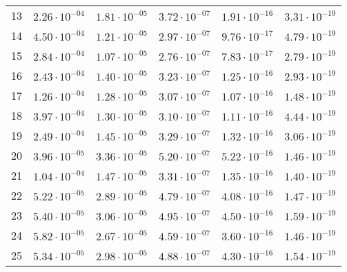 \begin{table}[h]
\begin{tabular}{llllll}
		13 &$\mathrm{2.26 \cdot 10^{-04}}$ & $\mathrm{1.81 \cdot 10^{-05}}$ & $\mathrm{3.72 \cdot 10^{-07}}$ & $\mathrm{1.91 \cdot 10^{-16}}$ & $\mathrm{3.31 \cdot 10^{-19}}$ \\
		14 &$\mathrm{4.50 \cdot 10^{-04}}$ & $\mathrm{1.21 \cdot 10^{-05}}$ & $\mathrm{2.97 \cdot 10^{-07}}$ & $\mathrm{9.76 \cdot 10^{-17}}$ & $\mathrm{4.79 \cdot 10^{-19}}$ \\
		15 &$\mathrm{2.84 \cdot 10^{-04}}$ & $\mathrm{1.07 \cdot 10^{-05}}$ & $\mathrm{2.76 \cdot 10^{-07}}$ & $\mathrm{7.83 \cdot 10^{-17}}$ & $\mathrm{2.79 \cdot 10^{-19}}$ \\
		16 &$\mathrm{2.43 \cdot 10^{-04}}$ & $\mathrm{1.40 \cdot 10^{-05}}$ & $\mathrm{3.23 \cdot 10^{-07}}$ & $\mathrm{1.25 \cdot 10^{-16}}$ & $\mathrm{2.93 \cdot 10^{-19}}$ \\
		17 &$\mathrm{1.26 \cdot 10^{-04}}$ & $\mathrm{1.28 \cdot 10^{-05}}$ & $\mathrm{3.07 \cdot 10^{-07}}$ & $\mathrm{1.07 \cdot 10^{-16}}$ & $\mathrm{1.48 \cdot 10^{-19}}$ \\
		18 &$\mathrm{3.97 \cdot 10^{-04}}$ & $\mathrm{1.30 \cdot 10^{-05}}$ & $\mathrm{3.10 \cdot 10^{-07}}$ & $\mathrm{1.11 \cdot 10^{-16}}$ & $\mathrm{4.44 \cdot 10^{-19}}$ \\
		19 &$\mathrm{2.49 \cdot 10^{-04}}$ & $\mathrm{1.45 \cdot 10^{-05}}$ & $\mathrm{3.29 \cdot 10^{-07}}$ & $\mathrm{1.32 \cdot 10^{-16}}$ & $\mathrm{3.06 \cdot 10^{-19}}$ \\
		20 &$\mathrm{3.96 \cdot 10^{-05}}$ & $\mathrm{3.36 \cdot 10^{-05}}$ & $\mathrm{5.20 \cdot 10^{-07}}$ & $\mathrm{5.22 \cdot 10^{-16}}$ & $\mathrm{1.46 \cdot 10^{-19}}$ \\
		21 &$\mathrm{1.04 \cdot 10^{-04}}$ & $\mathrm{1.47 \cdot 10^{-05}}$ & $\mathrm{3.31 \cdot 10^{-07}}$ & $\mathrm{1.35 \cdot 10^{-16}}$ & $\mathrm{1.40 \cdot 10^{-19}}$ \\
		22 &$\mathrm{5.22 \cdot 10^{-05}}$ & $\mathrm{2.89 \cdot 10^{-05}}$ & $\mathrm{4.79 \cdot 10^{-07}}$ & $\mathrm{4.08 \cdot 10^{-16}}$ & $\mathrm{1.47 \cdot 10^{-19}}$ \\
		23 &$\mathrm{5.40 \cdot 10^{-05}}$ & $\mathrm{3.06 \cdot 10^{-05}}$ & $\mathrm{4.95 \cdot 10^{-07}}$ & $\mathrm{4.50 \cdot 10^{-16}}$ & $\mathrm{1.59 \cdot 10^{-19}}$ \\
		24 &$\mathrm{5.82 \cdot 10^{-05}}$ & $\mathrm{2.67 \cdot 10^{-05}}$ & $\mathrm{4.59 \cdot 10^{-07}}$ & $\mathrm{3.60 \cdot 10^{-16}}$ & $\mathrm{1.46 \cdot 10^{-19}}$ \\
		25 &$\mathrm{5.34 \cdot 10^{-05}}$ & $\mathrm{2.98 \cdot 10^{-05}}$ & $\mathrm{4.88 \cdot 10^{-07}}$ & $\mathrm{4.30 \cdot 10^{-16}}$ & $\mathrm{1.54 \cdot 10^{-19}}$ \\

\end{tabular}
\end{table}
